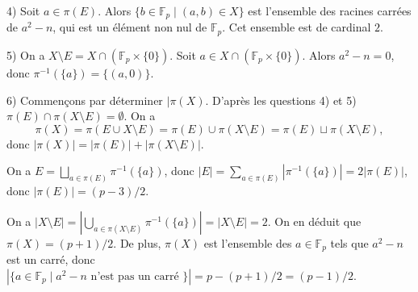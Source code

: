 \documentclass[11pt,a4paper]{article}
\newcommand{\F}{\mathbb{F}}
\begin{document}
4) Soit $a\in \pi(E)$. Alors $\{b\in \F_p\mid (a,b)\in X\}$ est l'ensemble des racines carrées de $a^2-n$, qui est un élément non nul de $\F_p$. Cet ensemble est de cardinal $2$. 

5) On a $X\setminus E=X\cap (\F_p\times \{0\})$. Soit $a\in X\cap (\F_p\times \{0\})$. Alors $a^2-n=0$, donc $\pi^{-1}(\{a\})=\{(a,0)\}$.

6)  Commençons par déterminer $|\pi(X)$.  D'après les questions 4) et 5) $\pi(E)\cap \pi(X\setminus E)=\emptyset$. On a \[\pi(X)=\pi(E\cup X\setminus E)=\pi(E)\cup \pi(X\setminus E)=\pi(E)\sqcup \pi(X\setminus E),\]  donc $|\pi(X)|=|\pi(E)|+|\pi(X\setminus E)|$.

On a $E=\bigsqcup_{a\in \pi(E)}\pi^{-1}(\{a\})$, donc $|E|=\sum_{a\in \pi(E)}|\pi^{-1}(\{a\})|=2|\pi(E)|$, donc $|\pi(E)|=(p-3)/2$. 

On a $|X\setminus E|=|\bigcup_{a\in \pi(X\setminus E)} \pi^{-1}(\{a\})|=|X\setminus E|=2$. On en déduit que $\pi(X)=(p+1)/2$. De plus, $\pi(X)$ est l'ensemble des $a\in \F_p$ tels que $a^2-n$ est un carré, donc $|\{a\in \F_p\mid a^2-n \text{ n'est pas un carré }\}|=p-(p+1)/2=(p-1)/2$. 
\end{document}
